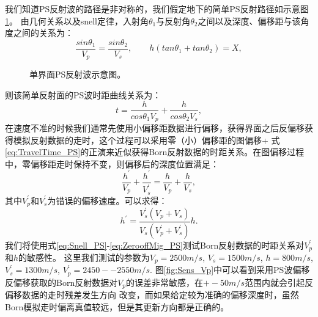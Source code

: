 我们知道PS反射波的路径是非对称的，我们假定地下的简单PS反射路径如示意图\ref{fig:PS_refl}。
由几何关系以及snell定律，入射角$\theta_1$与反射角$\theta_2$之间以及深度、偏移距与该角度之间的关系为：
\begin{equation}
    \frac{sin\theta_1}{V_p}=\frac{sin\theta_2}{V_s},\qquad
    h(tan\theta_1+tan\theta_2)=X,
    \label{eq:Snell_PS} 
\end{equation}
\begin{figure}
   \centering
   \caption{单界面PS反射波示意图。}
   \label{fig:PS_refl}
\end{figure}
则该简单反射面的PS波时距曲线关系为：
\begin{equation}
	t=\frac{h}{cos\theta_1V_p}+\frac{h}{cos\theta_2V_s},
    \label{eq:TravelTime_PS} 
\end{equation}
在速度不准的时候我们通常先使用小偏移距数据进行偏移，获得界面之后反偏移获得模拟反射数据的走时，这个过程可以采用零（小）偏移距的图偏移+
式\ref{eq:TravelTime_PS}的正演来近似获得Born反射数据的时距关系。在图偏移过程中，零偏移距走时保持不变，则偏移后的深度位置满足：
\begin{equation}
	\frac{h^{'}}{V_p}+\frac{h^{'}}{V^{'}_s}=\frac{h}{V_p}+\frac{h}{V_s},
    \label{eq:Mapmigration_PS} 
\end{equation}
其中$V^{'}_p$和$V^{'}_s$为错误的偏移速度。可以求得：
\begin{equation}
	{h^{'}}=\frac{V^{'}_s(V_p+V_s)}{V_s(V^{'}_p+V^{'}_s)}h.
    \label{eq:ZerooffMig_PS} 
\end{equation}
我们将使用式\ref{eq:Snell_PS}-\ref{eq:ZerooffMig_PS}测试Born反射数据的时距关系对$V^{'}_p$和$h$的敏感性。
这里我们测试的参数为$V_p=2500m/s$, $V_s=1500m/s$, $h=800m/s$, $V^{'}_s=1300m/s$, $V^{'}_p=2450--2550m/s$.
图\ref{fig:Sens_Vp}中可以看到采用PS波偏移反偏移获取的Born反射数据对$V_p$的误差非常敏感，在$+-50m/s$范围内就会引起反偏移数据的走时残差发生方向
改变，而如果给定较为准确的偏移深度时，虽然Born模拟走时偏离真值较远，但是其更新方向都是正确的。

